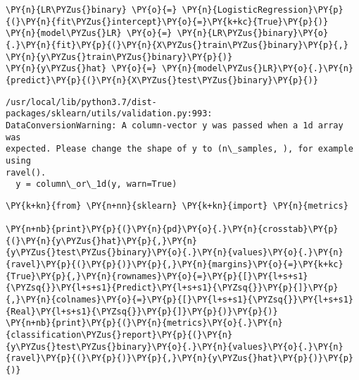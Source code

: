     \begin{tcolorbox}[breakable, size=fbox, boxrule=1pt, pad at break*=1mm,colback=cellbackground, colframe=cellborder]
\begin{Verbatim}[commandchars=\\\{\}]
\PY{n}{LR\PYZus{}binary} \PY{o}{=} \PY{n}{LogisticRegression}\PY{p}{(}\PY{n}{fit\PYZus{}intercept}\PY{o}{=}\PY{k+kc}{True}\PY{p}{)}
\PY{n}{model\PYZus{}LR} \PY{o}{=} \PY{n}{LR\PYZus{}binary}\PY{o}{.}\PY{n}{fit}\PY{p}{(}\PY{n}{X\PYZus{}train\PYZus{}binary}\PY{p}{,} \PY{n}{y\PYZus{}train\PYZus{}binary}\PY{p}{)}
\PY{n}{y\PYZus{}hat} \PY{o}{=} \PY{n}{model\PYZus{}LR}\PY{o}{.}\PY{n}{predict}\PY{p}{(}\PY{n}{X\PYZus{}test\PYZus{}binary}\PY{p}{)}
\end{Verbatim}
\end{tcolorbox}

    \begin{Verbatim}[commandchars=\\\{\}]
/usr/local/lib/python3.7/dist-packages/sklearn/utils/validation.py:993:
DataConversionWarning: A column-vector y was passed when a 1d array was
expected. Please change the shape of y to (n\_samples, ), for example using
ravel().
  y = column\_or\_1d(y, warn=True)
    \end{Verbatim}

    \begin{tcolorbox}[breakable, size=fbox, boxrule=1pt, pad at break*=1mm,colback=cellbackground, colframe=cellborder]
\begin{Verbatim}[commandchars=\\\{\}]
\PY{k+kn}{from} \PY{n+nn}{sklearn} \PY{k+kn}{import} \PY{n}{metrics}

\PY{n+nb}{print}\PY{p}{(}\PY{n}{pd}\PY{o}{.}\PY{n}{crosstab}\PY{p}{(}\PY{n}{y\PYZus{}hat}\PY{p}{,}\PY{n}{y\PYZus{}test\PYZus{}binary}\PY{o}{.}\PY{n}{values}\PY{o}{.}\PY{n}{ravel}\PY{p}{(}\PY{p}{)}\PY{p}{,}\PY{n}{margins}\PY{o}{=}\PY{k+kc}{True}\PY{p}{,}\PY{n}{rownames}\PY{o}{=}\PY{p}{[}\PY{l+s+s1}{\PYZsq{}}\PY{l+s+s1}{Predict}\PY{l+s+s1}{\PYZsq{}}\PY{p}{]}\PY{p}{,}\PY{n}{colnames}\PY{o}{=}\PY{p}{[}\PY{l+s+s1}{\PYZsq{}}\PY{l+s+s1}{Real}\PY{l+s+s1}{\PYZsq{}}\PY{p}{]}\PY{p}{)}\PY{p}{)}
\PY{n+nb}{print}\PY{p}{(}\PY{n}{metrics}\PY{o}{.}\PY{n}{classification\PYZus{}report}\PY{p}{(}\PY{n}{y\PYZus{}test\PYZus{}binary}\PY{o}{.}\PY{n}{values}\PY{o}{.}\PY{n}{ravel}\PY{p}{(}\PY{p}{)}\PY{p}{,}\PY{n}{y\PYZus{}hat}\PY{p}{)}\PY{p}{)}
\end{Verbatim}
\end{tcolorbox}

